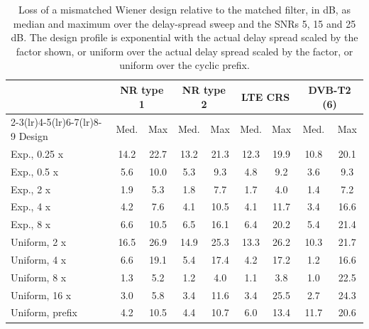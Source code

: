 \begin{table}[t]
\centering
\caption{Loss of a mismatched Wiener design relative to the matched filter, in dB, as median and maximum over the delay-spread sweep and the SNRs 5, 15 and 25 dB. The design profile is exponential with the actual delay spread scaled by the factor shown, or uniform over the actual delay spread scaled by the factor, or uniform over the cyclic prefix.}
\label{tab:mismatch}
\footnotesize
\setlength{\tabcolsep}{3pt}
\begin{tabular}{l cc cc cc cc}
\toprule
 & \multicolumn{2}{c}{NR type 1} & \multicolumn{2}{c}{NR type 2} & \multicolumn{2}{c}{LTE CRS} & \multicolumn{2}{c}{DVB-T2 (6)} \\
\cmidrule(lr){2-3}\cmidrule(lr){4-5}\cmidrule(lr){6-7}\cmidrule(lr){8-9}
Design & Med. & Max & Med. & Max & Med. & Max & Med. & Max \\
\midrule
Exp., 0.25 x & 14.2 & 22.7 & 13.2 & 21.3 & 12.3 & 19.9 & 10.8 & 20.1 \\
Exp., 0.5 x & 5.6 & 10.0 & 5.3 & 9.3 & 4.8 & 9.2 & 3.6 & 9.3 \\
Exp., 2 x & 1.9 & 5.3 & 1.8 & 7.7 & 1.7 & 4.0 & 1.4 & 7.2 \\
Exp., 4 x & 4.2 & 7.6 & 4.1 & 10.5 & 4.1 & 11.7 & 3.4 & 16.6 \\
Exp., 8 x & 6.6 & 10.5 & 6.5 & 16.1 & 6.4 & 20.2 & 5.4 & 21.4 \\
Uniform, 2 x & 16.5 & 26.9 & 14.9 & 25.3 & 13.3 & 26.2 & 10.3 & 21.7 \\
Uniform, 4 x & 6.6 & 19.1 & 5.4 & 17.4 & 4.2 & 17.2 & 1.2 & 16.6 \\
Uniform, 8 x & 1.3 & 5.2 & 1.2 & 4.0 & 1.1 & 3.8 & 1.0 & 22.5 \\
Uniform, 16 x & 3.0 & 5.8 & 3.4 & 11.6 & 3.4 & 25.5 & 2.7 & 24.3 \\
Uniform, prefix & 4.2 & 10.5 & 4.4 & 10.7 & 6.0 & 13.4 & 11.7 & 20.6 \\
\bottomrule
\end{tabular}
\end{table}
